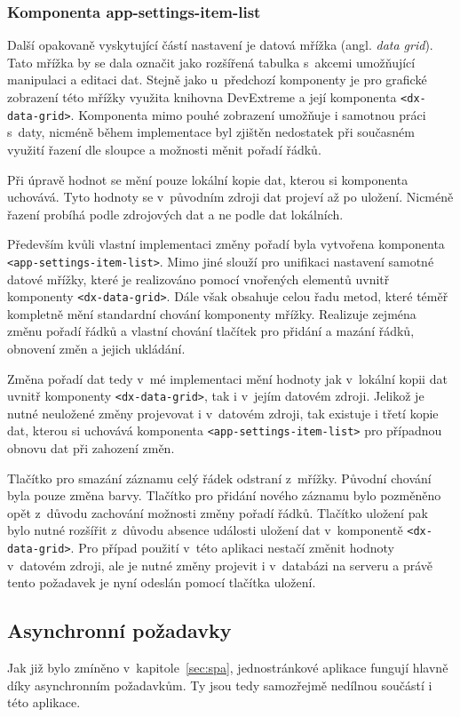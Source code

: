 \subsubsection*{Komponenta app-settings-item-list}
Další opakovaně vyskytující částí nastavení je datová mřížka (angl. \emph{data grid}). Tato mřížka by se dala označit jako rozšířená tabulka s~akcemi umožňující manipulaci a editaci dat. Stejně jako u~předchozí komponenty je pro grafické zobrazení této mřížky využita knihovna DevExtreme a její komponenta \texttt{<dx-data-grid>}. Komponenta mimo pouhé zobrazení umožňuje i samotnou práci s~daty, nicméně během implementace byl zjištěn nedostatek při současném využití řazení dle sloupce a možnosti měnit pořadí řádků.

Při úpravě hodnot se mění pouze lokální kopie dat, kterou si komponenta uchovává. Tyto hodnoty se v~původním zdroji dat projeví až po uložení. Nicméně řazení probíhá podle zdrojových dat a ne podle dat lokálních.

Především kvůli vlastní implementaci změny pořadí byla vytvořena komponenta \texttt{<app-settings-item-list>}. Mimo jiné slouží pro unifikaci nastavení samotné datové mřížky, které je realizováno pomocí vnořených elementů uvnitř komponenty \texttt{<dx-data-grid>}. Dále však obsahuje celou řadu metod, které téměř kompletně mění standardní chování komponenty mřížky. Realizuje zejména změnu pořadí řádků a vlastní chování tlačítek pro přidání a mazání řádků, obnovení změn a jejich ukládání.

Změna pořadí dat tedy v~mé implementaci mění hodnoty jak v~lokální kopii dat uvnitř komponenty \texttt{<dx-data-grid>}, tak i v~jejím datovém zdroji. Jelikož je nutné neuložené změny projevovat i v~datovém zdroji, tak existuje i třetí kopie dat, kterou si uchovává komponenta \texttt{<app-settings-item-list>} pro případnou obnovu dat při zahození změn.

Tlačítko pro smazání záznamu celý řádek odstraní z~mřížky. Původní chování byla pouze změna barvy. Tlačítko pro přidání nového záznamu bylo pozměněno opět z~důvodu zachování možnosti změny pořadí řádků. Tlačítko uložení pak bylo nutné rozšířit z~důvodu absence události uložení dat v~komponentě \texttt{<dx-data-grid>}. Pro případ použití v~této aplikaci nestačí změnit hodnoty v~datovém zdroji, ale je nutné změny projevit i v~databázi na serveru a právě tento požadavek je nyní odeslán pomocí tlačítka uložení. 


\subsection{Asynchronní požadavky}
Jak již bylo zmíněno v~kapitole~\ref{sec:spa}, jednostránkové aplikace fungují hlavně díky asynchronním požadavkům. Ty jsou tedy samozřejmě nedílnou součástí i této aplikace.


